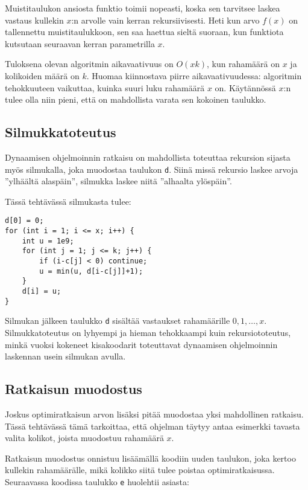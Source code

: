 Muistitaulukon ansiosta funktio toimii
nopeasti, koska sen tarvitsee laskea
vastaus kullekin $x$:n arvolle
vain kerran rekursiivisesti.
Heti kun arvo $f(x)$ on tallennettu muistitaulukkoon,
sen saa haettua sieltä suoraan,
kun funktiota kutsutaan seuraavan kerran parametrilla $x$.

Tuloksena olevan algoritmin aikavaativuus on $O(xk)$,
kun rahamäärä on $x$ ja kolikoiden määrä on $k$.
Huomaa kiinnostava piirre aikavaativuudessa:
algoritmin tehokkuuteen vaikuttaa,
kuinka suuri luku rahamäärä $x$ on.
Käytännössä $x$:n tulee olla niin pieni,
että on mahdollista varata sen kokoinen taulukko.

\subsection{Silmukkatoteutus}

Dynaamisen ohjelmoinnin ratkaisu on
mahdollista toteuttaa rekursion sijasta
myös silmukalla,
joka muodostaa taulukon \texttt{d}.
Siinä missä rekursio laskee arvoja
''ylhäältä alaspäin'',
silmukka laskee niitä ''alhaalta ylöspäin''.

\noindent
Tässä tehtävässä silmukasta tulee:

\begin{lstlisting}
d[0] = 0;
for (int i = 1; i <= x; i++) {
    int u = 1e9;
    for (int j = 1; j <= k; j++) {
        if (i-c[j] < 0) continue;
        u = min(u, d[i-c[j]]+1);
    }
    d[i] = u;
}
\end{lstlisting}

Silmukan jälkeen taulukko \texttt{d}
sisältää vastaukset rahamäärille
$0,1,\ldots,x$.
Silmukkatoteutus on lyhyempi ja
hieman tehokkaampi kuin rekursiototeutus,
minkä vuoksi kokeneet kisakoodarit
toteuttavat dynaamisen ohjelmoinnin
laskennan usein silmukan avulla.

\subsection{Ratkaisun muodostus}

Joskus optimiratkaisun arvon lisäksi
pitää muodostaa yksi mahdollinen ratkaisu.
Tässä tehtävässä tämä tarkoittaa,
että ohjelman täytyy antaa esimerkki
tavasta valita kolikot,
joista muodostuu rahamäärä $x$.

Ratkaisun muodostus onnistuu lisäämällä
koodiin uuden taulukon, joka kertoo
kullekin rahamäärälle,
mikä kolikko siitä tulee poistaa
optimiratkaisussa.
Seuraavassa koodissa taulukko \texttt{e}
huolehtii asiasta:

